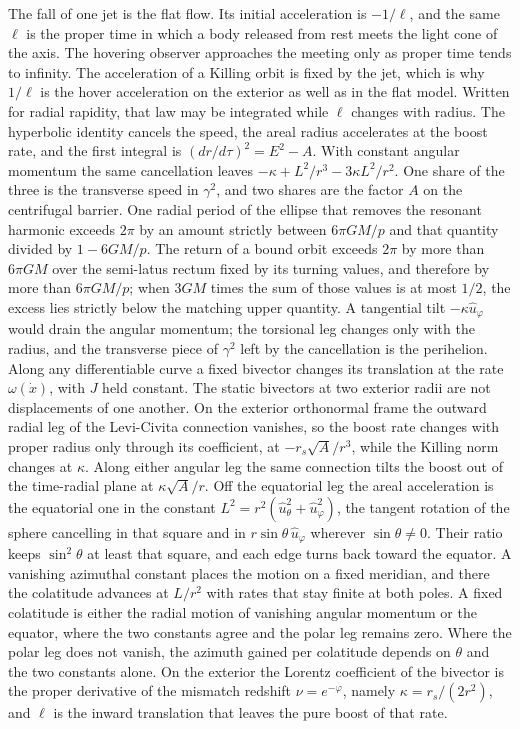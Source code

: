 \documentclass[a4paper]{article}
\begin{document}
The fall of one jet is the flat flow. Its initial acceleration is \(-1/\ell\), and the same \(\ell\) is the proper time in which a body released from rest meets the light cone of the axis. The hovering observer approaches the meeting only as proper time tends to infinity. The acceleration of a Killing orbit is fixed by the jet, which is why \(1/\ell\) is the hover acceleration on the exterior as well as in the flat model. Written for radial rapidity, that law may be integrated while \(\ell\) changes with radius. The hyperbolic identity cancels the speed, the areal radius accelerates at the boost rate, and the first integral is \((dr/d\tau)^{2}=E^{2}-A\). With constant angular momentum the same cancellation leaves \(-\kappa+L^{2}/r^{3}-3\kappa L^{2}/r^{2}\). One share of the three is the transverse speed in \(\gamma^{2}\), and two shares are the factor \(A\) on the centrifugal barrier. One radial period of the ellipse that removes the resonant harmonic exceeds \(2\pi\) by an amount strictly between \(6\pi GM/p\) and that quantity divided by \(1-6GM/p\). The return of a bound orbit exceeds \(2\pi\) by more than \(6\pi GM\) over the semi-latus rectum fixed by its turning values, and therefore by more than \(6\pi GM/p\); when \(3GM\) times the sum of those values is at most \(1/2\), the excess lies strictly below the matching upper quantity. A tangential tilt \(-\kappa\hat{u}_{\varphi}\) would drain the angular momentum; the torsional leg changes only with the radius, and the transverse piece of \(\gamma^{2}\) left by the cancellation is the perihelion. Along any differentiable curve a fixed bivector changes its translation at the rate \(\omega(\dot{x})\), with \(J\) held constant. The static bivectors at two exterior radii are not displacements of one another. On the exterior orthonormal frame the outward radial leg of the Levi-Civita connection vanishes, so the boost rate changes with proper radius only through its coefficient, at \(-r_{s}\sqrt{A}/r^{3}\), while the Killing norm changes at \(\kappa\). Along either angular leg the same connection tilts the boost out of the time-radial plane at \(\kappa\sqrt{A}/r\). Off the equatorial leg the areal acceleration is the equatorial one in the constant \(L^{2}=r^{2}(\hat{u}_{\theta}^{2}+\hat{u}_{\varphi}^{2})\), the tangent rotation of the sphere cancelling in that square and in \(r\sin\theta\,\hat{u}_{\varphi}\) wherever \(\sin\theta\neq 0\). Their ratio keeps \(\sin^{2}\theta\) at least that square, and each edge turns back toward the equator. A vanishing azimuthal constant places the motion on a fixed meridian, and there the colatitude advances at \(L/r^{2}\) with rates that stay finite at both poles. A fixed colatitude is either the radial motion of vanishing angular momentum or the equator, where the two constants agree and the polar leg remains zero. Where the polar leg does not vanish, the azimuth gained per colatitude depends on \(\theta\) and the two constants alone. On the exterior the Lorentz coefficient of the bivector is the proper derivative of the mismatch redshift \(\nu=e^{-\varphi}\), namely \(\kappa=r_{s}/(2r^{2})\), and \(\ell\) is the inward translation that leaves the pure boost of that rate.
\end{document}
